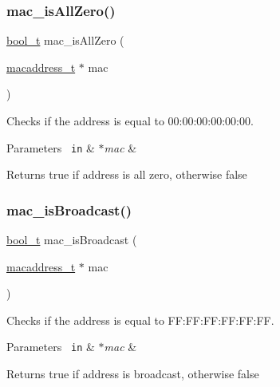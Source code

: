 \subsubsection{\texorpdfstring{mac\_isAllZero()}{mac\_isAllZero()}}
{\footnotesize\ttfamily \mbox{\hyperlink{bool_8h_a449976458a084f880dc8e3d29e7eb6f5}{bool\+\_\+t}} mac\+\_\+is\+All\+Zero (\begin{DoxyParamCaption}\item[{\mbox{\hyperlink{group__ethernet_gacb865bcbf50a6c8cef05581bfabff373}{macaddress\+\_\+t}} $\ast$}]{mac }\end{DoxyParamCaption})}



Checks if the address is equal to 00\+:00\+:00\+:00\+:00\+:00. 


\begin{DoxyParams}[1]{Parameters}
\mbox{\texttt{ in}}  & {\em $\ast$mac} & \\
\hline
\end{DoxyParams}
\begin{DoxyReturn}{Returns}
true if address is all zero, otherwise false 
\end{DoxyReturn}
\mbox{\label{group__mac__operations_ga14cfb5be92e80b193d9b9e196bd2b7b6}} 
\subsubsection{\texorpdfstring{mac\_isBroadcast()}{mac\_isBroadcast()}}
{\footnotesize\ttfamily \mbox{\hyperlink{bool_8h_a449976458a084f880dc8e3d29e7eb6f5}{bool\+\_\+t}} mac\+\_\+is\+Broadcast (\begin{DoxyParamCaption}\item[{\mbox{\hyperlink{group__ethernet_gacb865bcbf50a6c8cef05581bfabff373}{macaddress\+\_\+t}} $\ast$}]{mac }\end{DoxyParamCaption})}



Checks if the address is equal to F\+F\+:\+F\+F\+:\+F\+F\+:\+F\+F\+:\+FF\+:FF. 


\begin{DoxyParams}[1]{Parameters}
\mbox{\texttt{ in}}  & {\em $\ast$mac} & \\
\hline
\end{DoxyParams}
\begin{DoxyReturn}{Returns}
true if address is broadcast, otherwise false 
\end{DoxyReturn}
\mbox{\label{group__mac__operations_ga2d2d61d6c8965bcc6215ac86793ae141}} 
